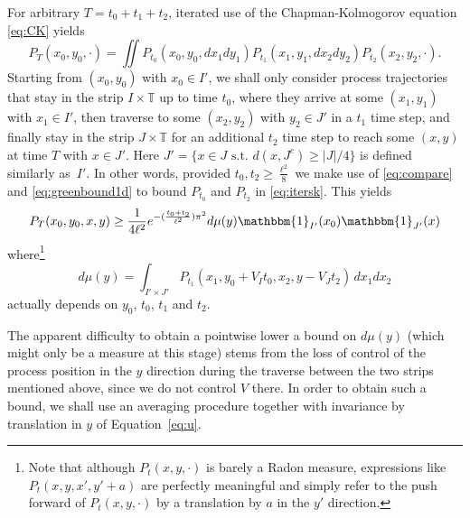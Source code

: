 \documentclass[12pt]{article}
\newcommand{\T}{\mathbb{T}}
\begin{document}
\medskip

For arbitrary $T = t_0 + t_1 + t_2$, iterated use of the Chapman-Kolmogorov equation \eqref{eq:CK} yields
\begin{equation}\label{eq:itersk}
P_T(x_0,y_0, \cdot)
= \iint P_{t_0}(x_0, y_0, dx_1dy_1)P_{t_1}(x_1, y_1, dx_2dy_2)P_{t_2}(x_2, y_2,
\cdot).
\end{equation}
Starting from $(x_0,y_0)$ with $x_0 \in I'$, we shall only consider 
process trajectories that stay in the strip $I \times \T$ up to time $t_0$, where they arrive at 
some $(x_1,y_1)$ with $x_1 \in I'$, then traverse to some $(x_2, y_2)$ with 
$y_2 \in J'$ in a $t_1$ time step, and finally stay in the strip $J \times \T$ for an
additional $t_2$ time step to reach some $(x,y)$ at time $T$ with $x \in J'$. Here 
$J' = \{x \in J \text{ s.t. } d(x,J^c) \geq |J|/4\}$ is defined similarly as~$I'$. In other 
words, provided $t_0, t_2 \geq \frac{\ell^2}{8}$ we make use of \eqref{eq:compare} and 
\eqref{eq:greenbound1d} to bound 
$P_{t_0}$ and $P_{t_2}$ in \eqref{eq:itersk}. This yields 
\begin{equation}\label{eq:salade}
P_T(x_0,y_0,x,y)\\ 
\geq \frac{1}{4\ell^2}e^{-(\frac{t_0 + t_2}{\ell^2})\pi^2}
 d\mu(y)  \mathbbm{1}_{I'}(x_0) \mathbbm{1}_{J'}(x) 
\end{equation}
where\footnote{Note that although $P_t(x,y, \cdot)$ is barely a Radon measure, 
expressions like $P_t(x,y, x', y' + a)$ are perfectly meaningful 
and simply refer to the push forward of $P_t(x, y, \cdot)$ by a translation 
by $a$ in the $y'$ direction.}
$$
d\mu(y) = \int_{I' \times J'}
P_{t_1}(x_1, y_0 + V_I t_0, x_2, y - V_J t_2)\, dx_1 dx_2
$$
actually depends on $y_0$, $t_0$, $t_1$ and $t_2$.

The apparent difficulty to
obtain a pointwise lower a bound on $d\mu(y)$ (which might only be a measure at
this stage) stems from the loss of control of the process position in the 
$y$ direction during the traverse between the two strips mentioned above, since
we do not control $V$ there. In order to obtain such a bound, we shall use an averaging
procedure together with invariance by translation in $y$ of Equation~\eqref{eq:u}.
\end{document}
